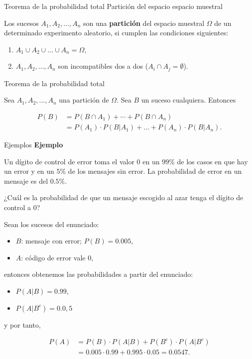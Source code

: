 \documentclass[
  ignorenonframetext,
]{beamer}
\providecommand{\tightlist}{%
  \setlength{\itemsep}{0pt}\setlength{\parskip}{0pt}}
\begin{document}
\begin{frame}{Teorema de la probabilidad total}
\protect\hypertarget{teorema-de-la-probabilidad-total-1}{}
Partición del espacio espacio muestral

Los sucesos \(A_1,A_2,\ldots, A_n\) son una \textbf{partición} del
espacio muestral \(\Omega\) de un determinado experimento aleatorio, si
cumplen las condiciones siguientes:

\begin{enumerate}
\tightlist
\item
  \(A_1\cup A_2\cup\ldots\cup A_n=\Omega\),
\item
  \(A_1,A_2,\ldots,A_n\) son incompatibles dos a dos
  (\(A_i\cap A_j=\emptyset\)).
\end{enumerate}

Teorema de la probabilidad total

Sea \(A_1,A_2,\ldots,A_n\) una partición de \(\Omega\). Sea \(B\) un
suceso cualquiera. Entonces

\[
\begin{array}{rl}
P(B)&= P(B\cap A_1)+\cdots +P(B\cap A_n)\\
& =P(A_1)\cdot P(B|A_1)+\ldots+P(A_n)\cdot P(B|A_n).
\end{array}
\]
\end{frame}

\begin{frame}{Ejemplos}
\protect\hypertarget{ejemplos-4}{}
\textbf{Ejemplo}

Un dígito de control de error toma el valor 0 en un \(99\%\) de los
casos en que hay un error y en un \(5\%\) de los mensajes sin error. La
probabilidad de error en un mensaje es del \(0.5\%\).

¿Cuál es la probabilidad de que un mensaje escogido al azar tenga el
dígito de control a 0?

Sean los sucesos del enunciado:

\begin{itemize}
\tightlist
\item
  \(B\): mensaje con error; \(P(B)=0.005\),
\item
  \(A\): código de error vale 0,
\end{itemize}

entonces obtenemos las probabilidades a partir del enunciado:

\begin{itemize}
\tightlist
\item
  \(P(A|B)=0.99,\)
\item
  \(P(A|B^c)= 0.0,5\)
\end{itemize}

y por tanto,

\[
\begin{array}{rl}
P(A) & =P(B)\cdot P(A|B)+P(B^c)\cdot P(A|B^c)\\ &
=0.005\cdot 0.99+0.995\cdot 0.05=0.0547.
\end{array}
\]
\end{frame}
\end{document}
